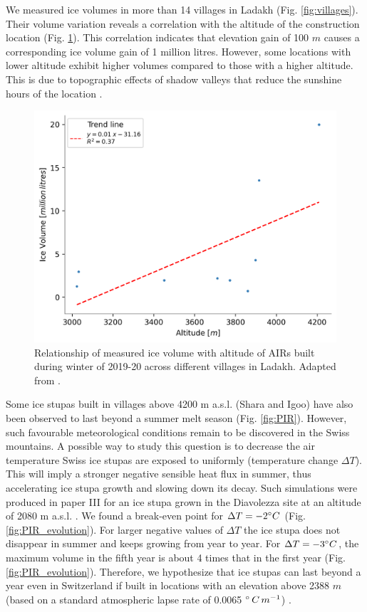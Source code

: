 We measured ice volumes in more than 14 villages in Ladakh (Fig. \ref{fig:villages}). Their volume variation
reveals a correlation with the altitude of the construction location (Fig. \ref{fig:altvsvol}). This correlation
indicates that elevation gain of 100 $m$ causes a corresponding ice volume gain of 1 million litres. However,
some locations with lower altitude exhibit higher volumes compared to those with a higher altitude. This is due
to topographic effects of shadow valleys that reduce the sunshine hours of the location
\citep{mariagruberIceStupasLadakh2022}.


\begin{figure}[htb]
	\centering
	\includegraphics[width=\textwidth]{figs/altitudevsvolume.png}
	\caption{Relationship of measured ice volume with altitude of \ac{AIRs} built during winter of 2019-20 across
		different villages in Ladakh. Adapted from \citet{mariagruberIceStupasLadakh2022}.}
	\label{fig:altvsvol}
\end{figure}

Some ice stupas built in villages above 4200 m \ac{a.s.l.} (Shara and Igoo) have also been observed to last
beyond a summer melt season (Fig. \ref{fig:PIR}). However, such favourable meteorological conditions remain to
be discovered in the Swiss mountains. A possible way to study this question is to decrease the air temperature
Swiss ice stupas are exposed to uniformly (temperature change $\Delta T$). This will imply a stronger negative
sensible heat flux in summer, thus accelerating ice stupa growth and slowing down its decay. Such simulations
were produced in paper III for an ice stupa grown in the Diavolezza site at an altitude of 2080 m \ac{a.s.l.} .
We found a break-even point for $\Delta T = -2 ^{\circ} C$ (Fig. \ref{fig:PIR_evolution}). For larger negative
values of $\Delta T$ the ice stupa does not disappear in summer and keeps growing from year to year. For $\Delta
	T = -3 ^{\circ} C$, the maximum volume in the fifth year is about 4 times that in the first year (Fig.
\ref{fig:PIR_evolution}). Therefore, we hypothesize that ice stupas can last beyond a year even in Switzerland
if built in locations with an elevation above 2388 $m$ (based on a standard atmospheric lapse rate of 0.0065
$^{\circ}\,C\,m^{-1}$) .

